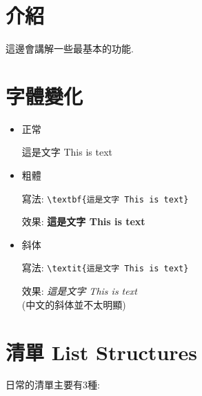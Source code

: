 

\section{介紹}

這邊會講解一些最基本的功能.

\section{字體變化}

\begin{itemize}
  \item
  {
    正常

    這是文字 This is text
  } %

  \item
  {
    粗體

    寫法: \verb|\textbf{這是文字 This is text}|

    效果: \textbf{這是文字 This is text}
  } %

  \item
  {
    斜体

    寫法: \verb|\textit{這是文字 This is text}|

    效果: \textit{這是文字 This is text}\\
    (中文的斜体並不太明顯)
  } %
\end{itemize}

\newpage
\section{清單 List Structures}

  日常的清單主要有3種:

